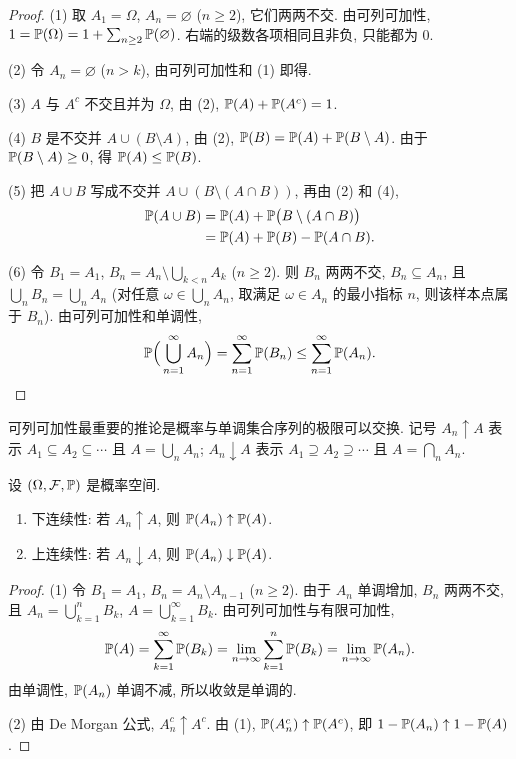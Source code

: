 \begin{proof}
(1) 取 $A_1=\Omega$, $A_n=\varnothing$ ($n\ge2$), 它们两两不交. 由可列可加性, $1=\P(\Omega)=1+\sum_{n\ge2}\P(\varnothing)$. 右端的级数各项相同且非负, 只能都为 $0$.

(2) 令 $A_n=\varnothing$ ($n>k$), 由可列可加性和 (1) 即得.

(3) $A$ 与 $A^c$ 不交且并为 $\Omega$, 由 (2), $\P(A)+\P(A^c)=1$.

(4) $B$ 是不交并 $A\cup(B\setminus A)$, 由 (2), $\P(B)=\P(A)+\P(B\setminus A)$. 由于 $\P(B\setminus A)\ge0$, 得 $\P(A)\le\P(B)$.

(5) 把 $A\cup B$ 写成不交并 $A\cup(B\setminus(A\cap B))$, 再由 (2) 和 (4),
\begin{align*}
\P(A\cup B)&=\P(A)+\P\big(B\setminus(A\cap B)\big)\\
&=\P(A)+\P(B)-\P(A\cap B).
\end{align*}

(6) 令 $B_1=A_1$, $B_n=A_n\setminus\bigcup_{k<n}A_k$ ($n\ge2$). 则 $B_n$ 两两不交, $B_n\subseteq A_n$, 且 $\bigcup_n B_n=\bigcup_n A_n$ (对任意 $\omega\in\bigcup_n A_n$, 取满足 $\omega\in A_n$ 的最小指标 $n$, 则该样本点属于 $B_n$). 由可列可加性和单调性,
\[
\P\Big(\bigcup_{n=1}^\infty A_n\Big)=\sum_{n=1}^\infty\P(B_n)\le\sum_{n=1}^\infty\P(A_n). \qedhere
\]
\end{proof}

可列可加性最重要的推论是概率与单调集合序列的极限可以交换. 记号 $A_n\uparrow A$ 表示 $A_1\subseteq A_2\subseteq\cdots$ 且 $A=\bigcup_n A_n$; $A_n\downarrow A$ 表示 $A_1\supseteq A_2\supseteq\cdots$ 且 $A=\bigcap_n A_n$.

\begin{theorem}[概率的连续性]\label{thm:continuity}
设 $(\Omega,\mathcal{F},\P)$ 是概率空间.
\begin{enumerate}
\item 下连续性: 若 $A_n\uparrow A$, 则 $\P(A_n)\uparrow\P(A)$.
\item 上连续性: 若 $A_n\downarrow A$, 则 $\P(A_n)\downarrow\P(A)$.
\end{enumerate}
\end{theorem}

\begin{proof}
(1) 令 $B_1=A_1$, $B_n=A_n\setminus A_{n-1}$ ($n\ge2$). 由于 $A_n$ 单调增加, $B_n$ 两两不交, 且 $A_n=\bigcup_{k=1}^n B_k$, $A=\bigcup_{k=1}^\infty B_k$. 由可列可加性与有限可加性,
\[
\P(A)=\sum_{k=1}^\infty\P(B_k)=\lim_{n\to\infty}\sum_{k=1}^n\P(B_k)=\lim_{n\to\infty}\P(A_n).
\]
由单调性, $\P(A_n)$ 单调不减, 所以收敛是单调的.

(2) 由 De Morgan 公式, $A_n^c\uparrow A^c$. 由 (1), $\P(A_n^c)\uparrow\P(A^c)$, 即 $1-\P(A_n)\uparrow1-\P(A)$.
\end{proof}

